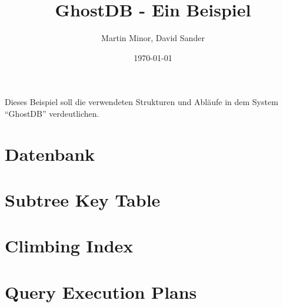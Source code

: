 \documentclass[a4paper, pdftex, notitlepage, parskip]{scrreprt}
\begin{document}
\title{\vspace{2cm} \Huge GhostDB - Ein Beispiel \vspace{2cm}}
\author{Martin Minor, David Sander}
\date{\today}
\maketitle
\vspace{2cm}
%
Dieses Beispiel soll die verwendeten Strukturen und Abläufe in dem System ``GhostDB'' verdeutlichen.
%
\tableofcontents
\listoffigures
\listoftables
\pagestyle{headings}
%

\chapter{Datenbank}

\chapter{Subtree Key Table}

\chapter{Climbing Index}



\chapter{Query Execution Plans}\label{chp:Query Execution Plans}

%
\end{document}
